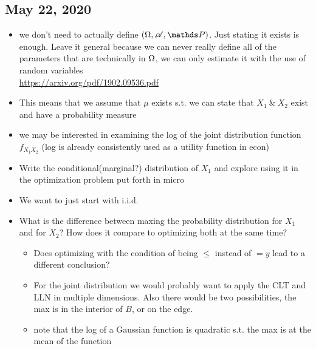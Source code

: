 \subsection{May 22, 2020}

\begin{itemize}
	\item we don't need to actually define $(\Om, \Ac, \Pb)$. Just stating it exists is enough. Leave it general because we can never really define all of the parameters that are technically in $\Omega$, we can only estimate it with the use of random variables \\ \url{https://arxiv.org/pdf/1902.09536.pdf}
	\item This means that we assume that $\mu$ exists s.t. we can state that $X_1\ \&\ X_2$ exist and have a probability measure
	\item we may be interested in examining the log of the joint distribution function $f_{X_1X_2}$ (log is already consistently used as a utility function in econ)
	\item {Write the conditional(marginal?) distribution of $X_1$ and explore using it in the optimization problem put forth in micro}
	\item We want to just start with i.i.d.\\
	\item {What is the difference between maxing the probability distribution for $X_1$ and for $X_2$? How does it compare to optimizing both at the same time?} %
	\begin{itemize}
		\item {Does optimizing with the condition of being $\leq$ instead of $=y$ lead to a different conclusion?}
		\item For the joint distribution we would probably want to apply the CLT and LLN in multiple dimensions. Also there would be two possibilities, the max is in the interior of $B$, or on the edge. 
		\item note that the log of a Gaussian function is quadratic s.t. the max is at the mean of the function

\end{itemize}
\end{itemize}
